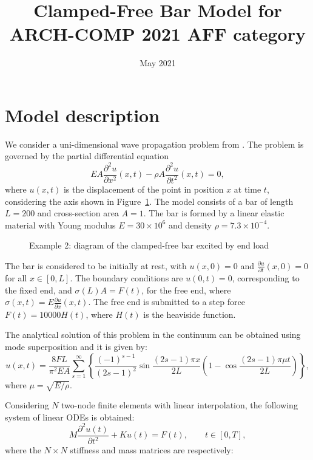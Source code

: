 \documentclass{article}
\title{Clamped-Free Bar Model for ARCH-COMP 2021 AFF category}
\date{May 2021}
\begin{document}
\maketitle

\section{Model description}

We consider a uni-dimensional wave propagation problem from \citep{malakiyeh2019bathe}. The problem is governed by the partial differential equation
\begin{equation}
EA \dfrac{\partial^2 u} {\partial x^2}(x,t) - \rho A \frac{\partial^2 u}{\partial t^2}(x,t) = 0, \label{eq:clamped_bar}
\end{equation}
where $u(x,t)$ is the displacement of the point in position $x$ at time $t$, considering the axis shown in Figure~\ref{fig:clampedDiagram}.
%
The model consists of a bar of length $L=200$ and cross-section area $A=1$. The bar is formed by a linear elastic material with Young modulus $E = 30\times 10^6$ and density $\rho = 7.3 \times 10^{-4}$.
%

\begin{figure}[htb]
	\centering
	\def\svgwidth{0.65\textwidth}
	
	\caption{Example 2: diagram of the clamped-free bar excited by end load}
	\label{fig:clampedDiagram}
\end{figure}

The bar is considered to be initially at rest, with $u(x, 0) = 0$ and $\frac{\partial u}{\partial t}(x, 0) = 0$ for all $x \in [0, L]$. %
%
The boundary conditions are $u(0, t) = 0$, corresponding to the fixed end, and  $\sigma(L) A = F(t)$, for the free end, where $\sigma(x,t) = E \frac{\partial u}{\partial x}(x,t)$.
%
The free end is submitted to a step force $F(t) = 10000 H(t)$, where $H(t)$ is the heaviside function.

The analytical solution of this problem in the continuum can be obtained using mode superposition \citep{geradin2014mechanical} and it is given by:
%
\begin{equation}
u(x, t) = \dfrac{8FL}{\pi^2 E A } \sum_{s = 1}^{\infty} \left\{ \dfrac{(-1)^{s-1}}{(2s-1)^2}\sin \dfrac{(2s-1)\pi x}{2L}\left(1 - \cos \dfrac{(2s-1)\pi \mu t}{2L} \right)
\right\},
\label{eq:clamped_solution}
\end{equation}
where $\mu = \sqrt{E/\rho}$.

Considering $N$ two-node finite elements with linear interpolation, the following system of linear ODEs is obtained:
\begin{equation} \label{eqn:dynamicsfem}
M\dfrac{\partial^2 u(t)}{\partial t^2}+ Ku(t) = F(t), \qquad t \in [0, T],
\end{equation}
where the $N\times N$ stiffness and mass matrices are respectively:
\end{document}
